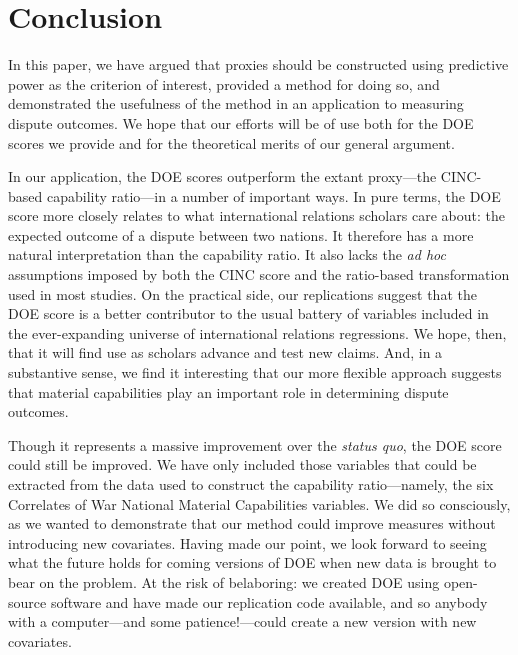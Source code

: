 \section{Conclusion}
\label{sec:conclusion}

In this paper, we have argued that proxies should be constructed using predictive power as the criterion of interest, provided a method for doing so, and demonstrated the usefulness of the method in an application to measuring dispute outcomes.
We hope that our efforts will be of use both for the DOE scores we provide and for the theoretical merits of our general argument.

In our application, the DOE scores outperform the extant proxy---the CINC-based capability ratio---in a number of important ways.
In pure terms, the DOE score more closely relates to what international relations scholars care about: the expected outcome of a dispute between two nations.
It therefore has a more natural interpretation than the capability ratio.
It also lacks the \emph{ad hoc} assumptions imposed by both the CINC score and the ratio-based transformation used in most studies.
On the practical side, our replications suggest that the DOE score is a better contributor to the usual battery of variables included in the ever-expanding universe of international relations regressions.
We hope, then, that it will find use as scholars advance and test new claims. And, in a substantive sense, we find it interesting that our more flexible approach suggests that material capabilities play an important role in determining dispute outcomes.

Though it represents a massive improvement over the \emph{status quo}, the DOE score could still be improved.
We have only included those variables that could be extracted from the data used to construct the capability ratio---namely, the six Correlates of War National Material Capabilities variables.
We did so consciously, as we wanted to demonstrate that our method could improve measures without introducing new covariates.
Having made our point, we look forward to seeing what the future holds for coming versions of DOE when new data is brought to bear on the problem.
At the risk of belaboring: we created DOE using open-source software and have made our replication code available, and so anybody with a computer---and some patience!---could create a new version with new covariates.


